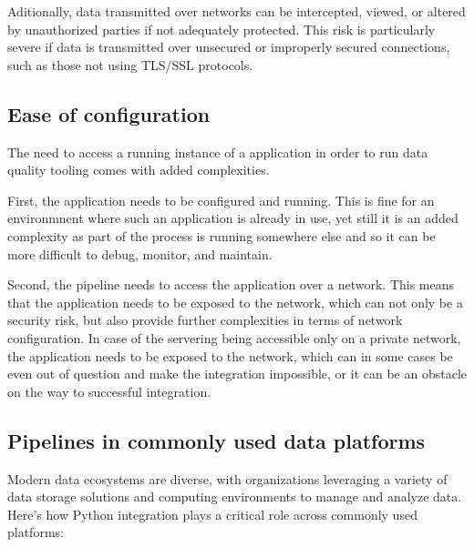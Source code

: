 Aditionally, data transmitted over networks can be intercepted, viewed, or altered by unauthorized parties if not adequately protected. This risk is particularly severe if data is transmitted over unsecured or improperly secured connections, such as those not using TLS/SSL protocols. 

\subsection{Ease of configuration}

The need to access a running instance of a  application in order to run data quality tooling comes with added complexities.

First, the application needs to be configured and running. This is fine for an environmnent where such an application is already in use, yet still it is an added complexity as part of the process is running somewhere else and so it can be more difficult to debug, monitor, and maintain.

Second, the pipeline needs to access the application over a network. This means that the application needs to be exposed to the network, which can not only be a security risk, but also provide further complexities in terms of network configuration. In case of the servering being accessible only on a private network, the application needs to be exposed to the network, which can in some cases be even out of question and make the integration impossible, or it can be an obstacle on the way to successful integration.

\subsection{Pipelines in commonly used data platforms}

Modern data ecosystems are diverse, with organizations leveraging a variety of data storage solutions and computing environments to manage and analyze data. Here’s how Python integration plays a critical role across commonly used platforms:

